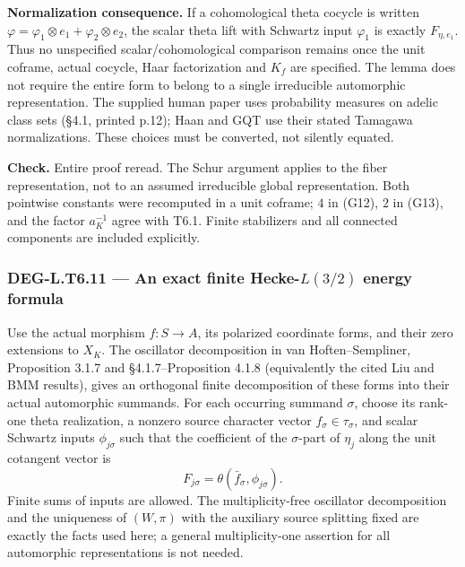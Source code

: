 \documentclass[11pt,a4paper]{article}
\theoremstyle{definition}
\begin{document}
\textbf{Normalization consequence.} If a cohomological theta cocycle is written \(\varphi=\varphi_1\otimes e_1+\varphi_2\otimes e_2\), the scalar theta lift with Schwartz input \(\varphi_1\) is exactly \(F_{\eta,e_1}\). Thus no unspecified scalar/cohomological comparison remains once the unit coframe, actual cocycle, Haar factorization and \(K_f\) are specified. The lemma does not require the entire form to belong to a single irreducible automorphic representation. The supplied human paper uses probability measures on adelic class sets (§4.1, printed p.12); Haan and GQT use their stated Tamagawa normalizations. These choices must be converted, not silently equated.

\textbf{Check.} Entire proof reread. The Schur argument applies to the fiber representation, not to an assumed irreducible global representation. Both pointwise constants were recomputed in a unit coframe; \(4\) in (G12), \(2\) in (G13), and the factor \(a_K^{-1}\) agree with T6.1. Finite stabilizers and all connected components are included explicitly.

\subsubsection{\texorpdfstring{DEG-L.T6.11 --- An exact finite Hecke-\(L(3/2)\) energy formula}{DEG-L.T6.11 --- An exact finite Hecke-L(3/2) energy formula}}\label{DEG-L.T6.11}

Use the actual morphism \(f:S\to A\), its polarized coordinate forms, and their zero extensions to \(X_K\). The oscillator decomposition in van Hoften--Sempliner, Proposition 3.1.7 and §4.1.7--Proposition 4.1.8 (equivalently the cited Liu and BMM results), gives an orthogonal finite decomposition of these forms into their actual automorphic summands. For each occurring summand \(\sigma\), choose its rank-one theta realization, a nonzero source character vector \(f_\sigma\in\tau_\sigma\), and scalar Schwartz inputs \(\phi_{j\sigma}\) such that the coefficient of the \(\sigma\)-part of \(\eta_j\) along the unit cotangent vector is \[
F_{j\sigma}=\theta(\bar f_\sigma,\phi_{j\sigma}).
\] Finite sums of inputs are allowed. The multiplicity-free oscillator decomposition and the uniqueness of \((W,\pi)\) with the auxiliary source splitting fixed are exactly the facts used here; a general multiplicity-one assertion for all automorphic representations is not needed.
\end{document}
